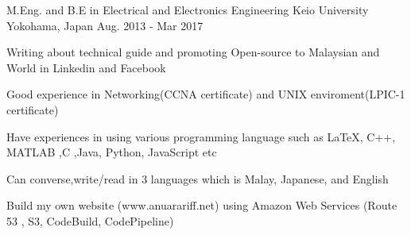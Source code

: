 



\begin{cventries}
    {M.Eng. and B.E in Electrical and Electronics Engineering} %
    {Keio University} %
    {Yokohama, Japan} %
    {Aug. 2013 - Mar 2017} %
    {
      \begin{cvitems} %
        \item {Writing about technical guide and promoting Open-source to Malaysian and World in Linkedin and Facebook}
		\item {Good experience in Networking(CCNA certificate) and UNIX enviroment(LPIC-1 certificate) }
        \item {Have experiences in using various programming language such as \LaTeX , C++, MATLAB ,C ,Java, Python, JavaScript etc}
        \item {Can converse,write/read  in 3 languages which is Malay, Japanese, and English }
		\item {Build my own website (www.anuarariff.net) using Amazon Web Services (Route 53 , S3, CodeBuild, CodePipeline)}
      \end{cvitems}
    }
\end{cventries}
